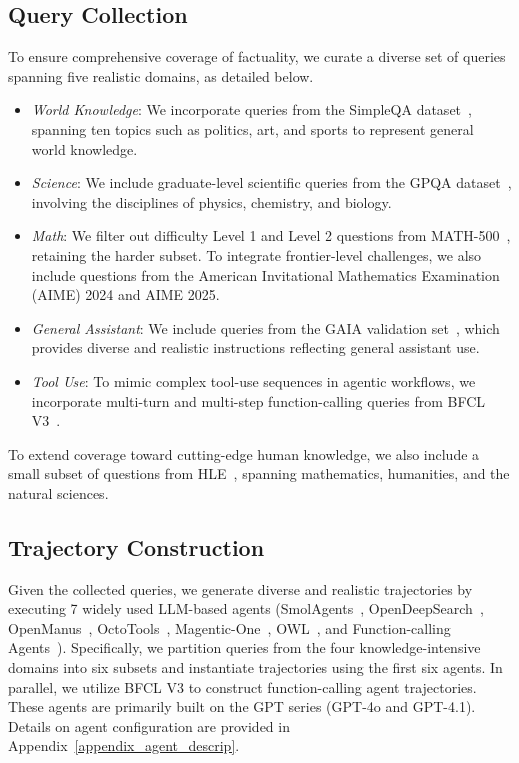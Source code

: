 \subsection{Query Collection}
\label{query_collection}
To ensure comprehensive coverage of factuality, we curate a diverse set of queries spanning five realistic domains, as detailed below.
\begin{itemize}[noitemsep,left=2pt, itemsep=0pt, topsep=0pt]
    \item \textit{World Knowledge}: We incorporate queries from the SimpleQA dataset~\cite{wei2024measuring}, spanning ten topics such as politics, art, and sports to represent general world knowledge.
    \item \textit{Science}: We include graduate-level scientific queries from the GPQA dataset~\cite{rein2024gpqa}, involving the disciplines of physics, chemistry, and biology.
    \item \textit{Math}: We filter out difficulty Level 1 and Level 2 questions from MATH-500~\cite{hendrycks2021measuring}, retaining the harder subset. To integrate frontier-level challenges, we also include questions from the American Invitational Mathematics Examination (AIME) 2024 and AIME 2025.
    \item \textit{General Assistant}: We include queries from the GAIA validation set~\cite{mialon2023gaia}, which provides diverse and realistic instructions reflecting general assistant use.
    \item \textit{Tool Use}: To mimic complex tool-use sequences in agentic workflows, we incorporate multi-turn and multi-step function-calling queries from BFCL V3~\cite{patilberkeley}.
\end{itemize}
To extend coverage toward cutting-edge human knowledge, we also include a small subset of questions from HLE~\cite{phan2025humanity}, spanning mathematics, humanities, and the natural sciences.

\subsection{Trajectory Construction}
\label{trajectory_construction}
Given the collected queries, we generate diverse and realistic trajectories by executing 7 widely used LLM-based agents (SmolAgents~\cite{roucher2025smolagents}, OpenDeepSearch~\cite{alzubi2025open}, OpenManus~\cite{openmanus2025}, OctoTools~\cite{lu2025octotools}, Magentic-One~\cite{fourney2024magentic}, OWL~\cite{hu2025owl}, and Function-calling Agents~\cite{patilberkeley}). Specifically, we partition queries from the four knowledge-intensive domains into six subsets and instantiate trajectories using the first six agents. In parallel, we utilize BFCL V3 to construct function-calling agent trajectories. These agents are primarily built on the GPT series (GPT-4o and GPT-4.1). Details on agent configuration are provided in Appendix~\ref{appendix_agent_descrip}. 

